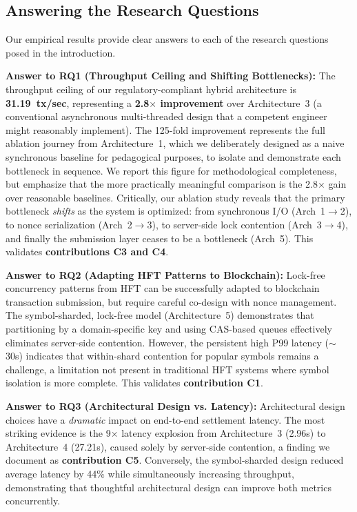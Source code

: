 \subsection{Answering the Research Questions}

Our empirical results provide clear answers to each of the research questions posed in the introduction.

\textbf{Answer to RQ1 (Throughput Ceiling and Shifting Bottlenecks):} The throughput ceiling of our regulatory-compliant hybrid architecture is \textbf{31.19~tx/sec}, representing a \textbf{2.8$\times$ improvement} over Architecture~3 (a conventional asynchronous multi-threaded design that a competent engineer might reasonably implement). The 125-fold improvement represents the full ablation journey from Architecture~1, which we deliberately designed as a naive synchronous baseline for pedagogical purposes, to isolate and demonstrate each bottleneck in sequence. We report this figure for methodological completeness, but emphasize that the more practically meaningful comparison is the 2.8$\times$ gain over reasonable baselines. Critically, our ablation study reveals that the primary bottleneck \textit{shifts} as the system is optimized: from synchronous I/O (Arch~1$\rightarrow$2), to nonce serialization (Arch~2$\rightarrow$3), to server-side lock contention (Arch~3$\rightarrow$4), and finally the submission layer ceases to be a bottleneck (Arch~5). This validates \textbf{contributions C3 and C4}.

\textbf{Answer to RQ2 (Adapting HFT Patterns to Blockchain):} Lock-free concurrency patterns from HFT can be successfully adapted to blockchain transaction submission, but require careful co-design with nonce management. The symbol-sharded, lock-free model (Architecture~5) demonstrates that partitioning by a domain-specific key and using CAS-based queues effectively eliminates server-side contention. However, the persistent high P99 latency ($\sim$30s) indicates that within-shard contention for popular symbols remains a challenge, a limitation not present in traditional HFT systems where symbol isolation is more complete. This validates \textbf{contribution C1}.

\textbf{Answer to RQ3 (Architectural Design vs. Latency):} Architectural design choices have a \textit{dramatic} impact on end-to-end settlement latency. The most striking evidence is the 9$\times$ latency explosion from Architecture~3 (2.96s) to Architecture~4 (27.21s), caused solely by server-side contention, a finding we document as \textbf{contribution C5}. Conversely, the symbol-sharded design reduced average latency by 44\% while simultaneously increasing throughput, demonstrating that thoughtful architectural design can improve both metrics concurrently.


